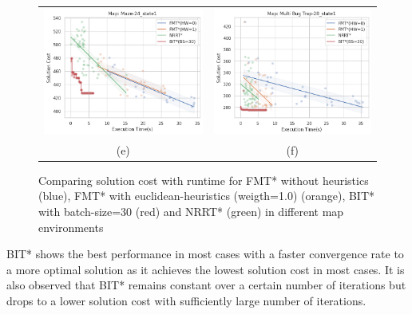 \documentclass{article}
\begin{document}
\begin{figure}[H]
{\begin{tabular}{cc}
			\includegraphics[scale=0.45]{scVet_Maze-24_state1.png} & \includegraphics[scale=0.45]{scVet_Multi Bug Trap-28_state1.png}  \\
			(e) & (f)  \\[6pt]
		\end{tabular}
	}
	\caption{Comparing solution cost with runtime for FMT* without heuristics (blue), FMT* with euclidean-heuristics (weigth=1.0) (orange), BIT* with batch-size=30 (red) and NRRT* (green) in different map environments}
\end{figure}

BIT* shows the best performance in most cases with a faster convergence rate to a more optimal solution as it achieves the lowest solution cost in most cases. It is also observed that BIT* remains constant over a certain number of iterations but drops to a lower solution cost with sufficiently large number of iterations.
\end{document}
